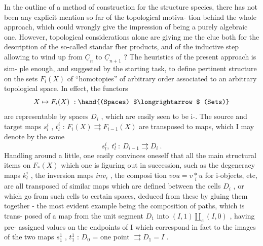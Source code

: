   In the outline of a method of construction for the structure species,
there has not been any explicit mention so far of the topological motiva-%
tion behind the whole approach,  which could wrongly give the impression
of being a purely algebraic one.  However,  topological considerations
alone are giving me the clue both for the description of the so-called
standar fber products,  and of the inductive step allowing to wind up
from $\underline{C}_{n}$ to $\underline{C}_{n+1}$ ?  The heuristics  of the present approach is sim-%
ple enough,  and suggested by the starting task,  to define pertinent
structure on the  sets $F_{i}(X)$ of ``homotopies'' of arbitrary order\hand{,} associated
to an arbitrary topological space.  In effect,  the  functors  
\[ X \mapsto F_{i}(X) \ : \hand{(Spaces) $\longrightarrow$ (Sets)} \]
are representable by spaces $D_{i}$ ,  which are easily seen to be i-.
The source and  target maps  $s^{i}_{l}$ , $t^{i}_{l}$ : $F_{i}(X) \rightrightarrows F_{i-1}(X)$  are transposed
to maps, which I may denote by the same 
\[ s^{i}_{l},\ t^{i}_{l} \ : \ D_{i-1} \rightrightarrows D_{i} \ . \]
Handling around a little,  one easily convinces oneself that all the
main structural items on $F_{*}(X)$ which one is figuring out in succession,
such as the degeneracy maps  $k^{i}_{l}$ ,  the inversion maps $inv_{i}$ ,  the composi
tion  $vou = v \underset{i}{*} u$  for  i-objects,  etc,  are all transposed of similar
maps which are defined between the cells $D_{i}$ ,  or which go from such
cells to certain spaces,  deduced from these by gluing them together -
the most evident example  being the composition of paths,  which is trans-%
posed of a map from the unit segment $D_{1}$ into $(I,1) \amalg_{e} (I,0)$ ,  having pre-%
assigned values on the endpoints of I \hand{(} which correspond in fact to the
images of the two maps  $s^{1}_{1}$ , $t_{1}^{1}$ :  $D_{0}$ = one point $\rightrightarrows D_{1} = I$ \hand{)}.

